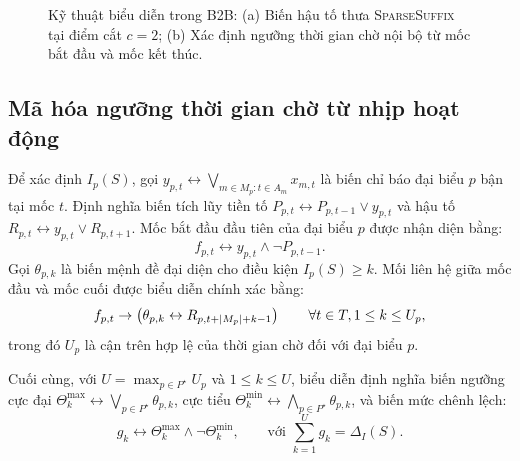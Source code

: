 \begin{figure}[tb]
\caption{Kỹ thuật biểu diễn trong B2B: (a) Biến hậu tố thưa \mbox{\textnormal{\textsc{SparseSuffix}}} tại điểm cắt $c=2$; (b) Xác định ngưỡng thời gian chờ nội bộ từ mốc bắt đầu và mốc kết thúc.}
\label{fig:b2b-encoding-ideas}
\end{figure}

\subsection{Mã hóa ngưỡng thời gian chờ từ nhịp hoạt động}

Để xác định \(I_p(S)\), gọi \(y_{p,t}\leftrightarrow\bigvee_{m\in M_p: t\in A_m}x_{m,t}\) là biến chỉ báo đại biểu \(p\) bận tại mốc \(t\). Định nghĩa biến tích lũy tiền tố \(P_{p,t}\leftrightarrow P_{p,t-1}\lor y_{p,t}\) và hậu tố \(R_{p,t}\leftrightarrow y_{p,t}\lor R_{p,t+1}\). Mốc bắt đầu đầu tiên của đại biểu \(p\) được nhận diện bằng:
\[
  f_{p,t} \leftrightarrow y_{p,t} \land \neg P_{p,t-1}.
\]
Gọi \(\theta_{p,k}\) là biến mệnh đề đại diện cho điều kiện \(I_p(S)\ge k\). Mối liên hệ giữa mốc đầu và mốc cuối được biểu diễn chính xác bằng:
\begin{equation}
  f_{p,t} \rightarrow \left(\theta_{p,k} \leftrightarrow R_{p, t + \lvert M_p\rvert + k - 1}\right)
  \qquad \forall t\in T, 1\le k\le U_p,
  \label{eq:b2b-span-threshold}
\end{equation}
trong đó \(U_p\) là cận trên hợp lệ của thời gian chờ đối với đại biểu \(p\).

Cuối cùng, với \(U=\max_{p\in P^\star} U_p\) và \(1\le k\le U\), biểu diễn định nghĩa biến ngưỡng cực đại \(\Theta_k^{\max}\leftrightarrow\bigvee_{p\in P^\star}\theta_{p,k}\), cực tiểu \(\Theta_k^{\min}\leftrightarrow\bigwedge_{p\in P^\star}\theta_{p,k}\), và biến mức chênh lệch:
\begin{equation}
  g_k \leftrightarrow \Theta_k^{\max} \land \neg \Theta_k^{\min}, \qquad \text{với } \sum_{k=1}^U g_k = \Delta_I(S).
  \label{eq:b2b-range-sum}
\end{equation}

